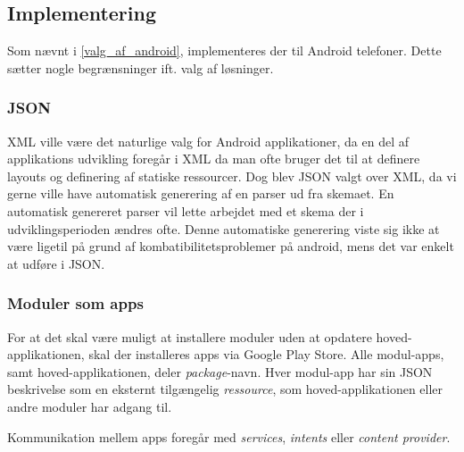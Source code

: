 \subsection{Implementering}
Som nævnt i \cref{valg_af_android}, implementeres der til Android telefoner.
Dette sætter nogle begrænsninger ift. valg af løsninger.

\subsubsection{JSON}
XML ville være det naturlige valg for Android applikationer, da en del af applikations udvikling foregår i XML da man ofte bruger det til at definere layouts og definering af statiske ressourcer. 
Dog blev JSON valgt over XML, da vi gerne ville have automatisk generering af en parser ud fra skemaet.
En automatisk genereret parser vil lette arbejdet med et skema der i udviklingsperioden ændres ofte.
Denne automatiske generering viste sig ikke at være ligetil på grund af kombatibilitetsproblemer på android, mens det var enkelt at udføre i JSON.

\subsubsection{Moduler som apps}
For at det skal være muligt at installere moduler uden at opdatere hoved-applikationen, skal der installeres apps via Google Play Store.
Alle modul-apps, samt hoved-applikationen, deler \textit{package}-navn.
Hver modul-app har sin JSON beskrivelse som en eksternt tilgængelig \textit{ressource}, som hoved-applikationen eller andre moduler har adgang til.

Kommunikation mellem apps foregår med \textit{services}, \textit{intents} eller \textit{content provider}.

